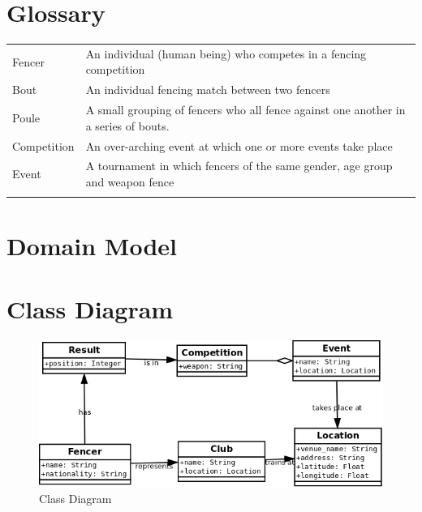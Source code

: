 \section{Glossary}
\begin{center}
\begin{tabular}{ |l|l| } 
 \hline
 Fencer & An individual (human being) who competes in a fencing competition \\ 
 Bout & An individual fencing match between two fencers \\ 
 Poule & A small grouping of fencers who all fence against one another in a
 series of bouts. \\ 
 Competition & An over-arching event at which one or more events take place \\
 Event & A tournament in which fencers of the same gender, age group and weapon
 fence \\
 
 \\
 \hline
\end{tabular}
\end{center}
\section{Domain Model}
\section{Class Diagram}
  \begin{figure}[!ht]
    \includegraphics[width=\textwidth]{class_diagram}
    \caption{Class Diagram}
  \end{figure}